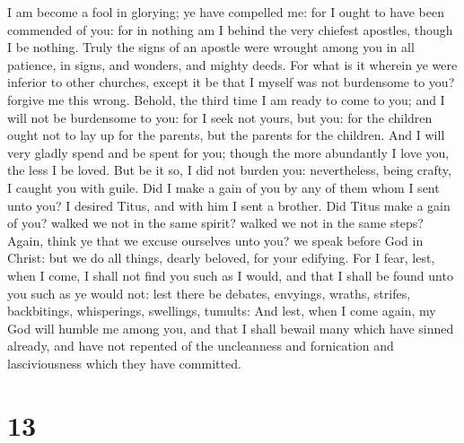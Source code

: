  I am become a fool in glorying; ye have compelled me: for
I ought to have been commended of you: for in nothing am I behind the
very chiefest apostles, though I be nothing.  Truly the
signs of an apostle were wrought among you in all patience, in signs,
and wonders, and mighty deeds.  For what is it wherein ye
were inferior to other churches, except it be that I myself was not
burdensome to you? forgive me this wrong.  Behold, the
third time I am ready to come to you; and I will not be burdensome to
you: for I seek not yours, but you: for the children ought not to lay up
for the parents, but the parents for the children.  And I
will very gladly spend and be spent for you; though the more abundantly
I love you, the less I be loved.  But be it so, I did not
burden you: nevertheless, being crafty, I caught you with guile.
 Did I make a gain of you by any of them whom I sent unto
you?  I desired Titus, and with him I sent a brother. Did
Titus make a gain of you? walked we not in the same spirit? walked we
not in the same steps?  Again, think ye that we excuse
ourselves unto you? we speak before God in Christ: but we do all things,
dearly beloved, for your edifying.  For I fear, lest, when
I come, I shall not find you such as I would, and that I shall be found
unto you such as ye would not: lest there be debates, envyings, wraths,
strifes, backbitings, whisperings, swellings, tumults:  And
lest, when I come again, my God will humble me among you, and that I
shall bewail many which have sinned already, and have not repented of
the uncleanness and fornication and lasciviousness which they have
committed.

\hypertarget{section-12}{%
\section{13}\label{section-12}}

